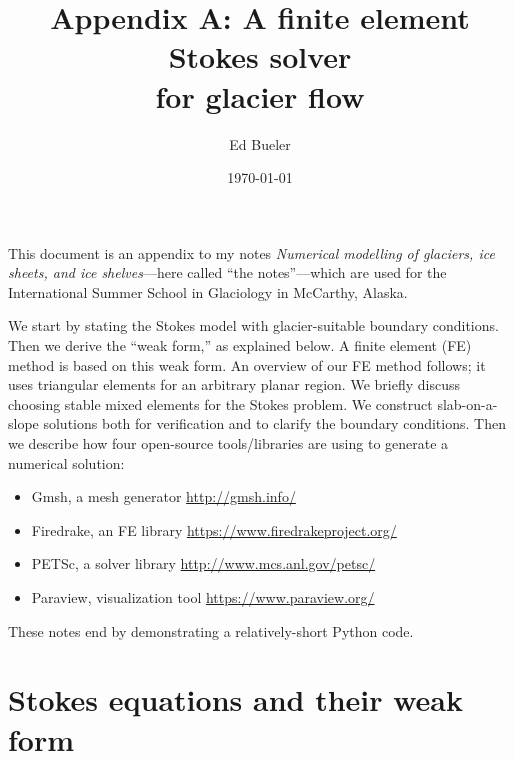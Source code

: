 \documentclass[letterpaper,final,12pt,reqno]{amsart}
\begin{document}
\graphicspath{{../figures/}}

\title[Appendix A: A finite element Stokes solver for glacier flow]{Appendix A: A finite element Stokes solver \\ for glacier flow}

\author{Ed Bueler}

\date{\today}

\maketitle

\renewcommand{\theequation}{A\arabic{equation}}


This document is an appendix to my notes \emph{Numerical modelling of glaciers, ice sheets, and ice shelves}---here called ``the notes''---which are used for the International Summer School in Glaciology in McCarthy, Alaska.

We start by stating the Stokes model with glacier-suitable boundary conditions.  Then we derive the ``weak form,'' as explained below.  A finite element (FE) method \cite{Elmanetal2014} is based on this weak form.  An overview of our FE method follows; it uses triangular elements for an arbitrary planar region.  We briefly discuss choosing stable mixed elements for the Stokes problem.  We construct slab-on-a-slope solutions both for verification and to clarify the boundary conditions.  Then we describe how four open-source tools/libraries are using to generate a numerical solution:
\begin{itemize}
\item Gmsh, a mesh generator \hfill \url{http://gmsh.info/}
\item Firedrake, an FE library \hfill \url{https://www.firedrakeproject.org/}
\item PETSc, a solver library \hfill \url{http://www.mcs.anl.gov/petsc/}
\item Paraview, visualization tool \hfill \url{https://www.paraview.org/}
\end{itemize}
These notes end by demonstrating a relatively-short Python code.

\section{Stokes equations and their weak form}
\end{document}
